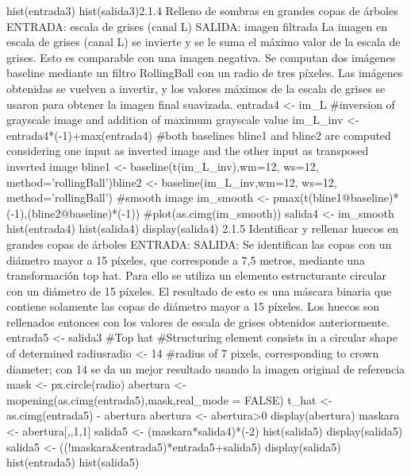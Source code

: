 hist(entrada3)
hist(salida3)2.1.4 Relleno de sombras en grandes copas de árboles
ENTRADA: escala de grises (canal L)
SALIDA: imagen filtrada
La imagen en escala de grises (canal L) se invierte y se le suma el máximo valor de la
escala de grises. Esto es comparable con una imagen negativa. Se computan dos
imágenes baseline mediante un filtro RollingBall con un radio de tres píxeles. Las
imágenes obtenidas se vuelven a invertir, y los valores máximos de la escala de grises se
usaron para obtener la imagen final suavizada.
entrada4 <- im_L
#inversion of grayscale image and addition of maximum grayscale value
im_L_inv <- entrada4*(-1)+max(entrada4)
#both baselines bline1 and bline2 are computed considering one input as inverted image
and the other input as transposed inverted image
bline1 <- baseline(t(im_L_inv),wm=12, ws=12, method='rollingBall')bline2 <- baseline(im_L_inv,wm=12, ws=12, method='rollingBall')
#smooth image
im_smooth <- pmax(t(bline1@baseline)*(-1),(bline2@baseline)*(-1))
#plot(as.cimg(im_smooth))
salida4 <- im_smooth
hist(entrada4)
hist(salida4)
display(salida4)
2.1.5 Identificar y rellenar huecos en grandes copas de árboles
ENTRADA:
SALIDA:
Se identifican las copas con un diámetro mayor a 15 píxeles, que corresponde a 7,5
metros, mediante una transformación top hat. Para ello se utiliza un elemento
estructurante circular con un diámetro de 15 píxeles. El resultado de esto es una máscara
binaria que contiene solamente las copas de diámetro mayor a 15 píxeles. Los huecos
son rellenados entonces con los valores de escala de grises obtenidos anteriormente.
entrada5 <- salida3
#Top hat
#Structuring element consists in a circular shape of determined radiusradio <- 14 #radius of 7 pixels, corresponding to crown diameter; con 14 se da un mejor
resultado usando la imagen original de referencia
mask <- px.circle(radio)
abertura <- mopening(as.cimg(entrada5),mask,real_mode = FALSE)
t_hat <- as.cimg(entrada5) - abertura
abertura <- abertura>0
display(abertura)
maskara <- abertura[,,1,1]
salida5 <- (maskara*salida4)*(-2)
hist(salida5)
display(salida5)
salida5 <- ((!maskara&entrada5)*entrada5+salida5)
display(salida5)
hist(entrada5)
hist(salida5)

